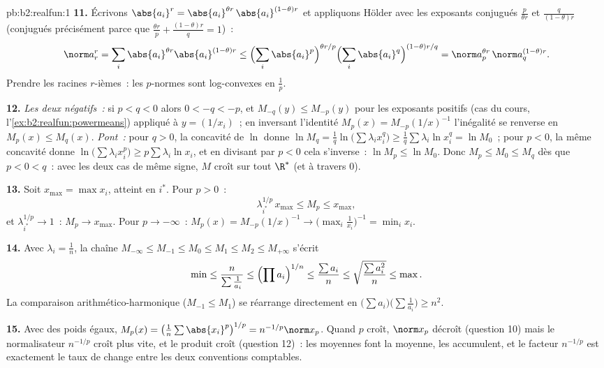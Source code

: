 \begin{solution}{pb:b2:realfun:1}
\textbf{11.} Écrivons $\abs{a_i}^r = \abs{a_i}^{\theta
r}\,\abs{a_i}^{(1-\theta)r}$ et appliquons Hölder avec les exposants
conjugués $\frac{p}{\theta r}$ et
$\frac{q}{(1-\theta)r}$ (conjugués précisément parce que
$\frac{\theta r}p + \frac{(1-\theta)r}q = 1$)~:
\[
\norm a_r^r = \sum_i \abs{a_i}^{\theta r}\abs{a_i}^{(1-\theta)r}
\leq \Bigl(\sum_i\abs{a_i}^{p}\Bigr)^{\theta r/p}
\Bigl(\sum_i\abs{a_i}^{q}\Bigr)^{(1-\theta)r/q}
= \norm a_p^{\theta r}\,\norm a_q^{(1-\theta)r} .
\]
Prendre les racines $r$-ièmes~: les $p$-normes sont log-convexes en
$\frac1p$.

\textbf{12.} \emph{Les deux négatifs~:} si $p < q < 0$ alors $0 < -q
< -p$, et $M_{-q}(y) \leq M_{-p}(y)$ pour les exposants positifs (cas
du cours, l'\cref{ex:b2:realfun:powermeans}) appliqué à $y =
(1/x_i)$~; en inversant l'identité $M_p(x) = M_{-p}(1/x)^{-1}$
l'inégalité se renverse en $M_p(x) \leq M_q(x)$.
\emph{Pont~:} pour $q > 0$, la concavité de $\ln$ donne $\ln M_q =
\frac1q\ln\bigl(\sum\lambda_ix_i^q\bigr) \geq
\frac1q\sum\lambda_i\ln x_i^q = \ln M_0$~; pour $p < 0$, la même
concavité donne $\ln\bigl(\sum\lambda_ix_i^p\bigr) \geq
p\sum\lambda_i\ln x_i$, et en divisant par $p < 0$ cela s'inverse~:
$\ln M_p \leq \ln M_0$. Donc $M_p \leq M_0 \leq M_q$ dès que $p < 0 <
q$~: avec les deux cas de même signe, $M$ croît sur tout
$\R^*$ (et à travers $0$).

\textbf{13.} Soit $x_{\max} = \max x_i$, atteint en $i^*$. Pour
$p > 0$~:
\[
\lambda_{i^*}^{1/p}\,x_{\max} \leq M_p \leq x_{\max},
\]
et $\lambda_{i^*}^{1/p} \to 1$~: $M_p \to x_{\max}$. Pour $p \to
-\infty$~: $M_p(x) = M_{-p}(1/x)^{-1} \to
\bigl(\max_i\frac1{x_i}\bigr)^{-1} = \min_ix_i$.

\textbf{14.} Avec $\lambda_i = \frac1n$, la chaîne $M_{-\infty}
\leq M_{-1} \leq M_0 \leq M_1 \leq M_2 \leq M_{+\infty}$ s'écrit
\[
\min \leq \frac{n}{\sum\frac1{a_i}} \leq \Bigl(\prod
a_i\Bigr)^{1/n} \leq \frac{\sum a_i}{n} \leq
\sqrt{\frac{\sum a_i^2}{n}} \leq \max .
\]
La comparaison arithmético-harmonique ($M_{-1} \leq M_1$) se
réarrange directement en
$\bigl(\sum a_i\bigr)\bigl(\sum\frac1{a_i}\bigr) \geq n^2$.

\textbf{15.} Avec des poids égaux, $M_p(x) =
\bigl(\frac1n\sum\abs{x_i}^p\bigr)^{1/p} = n^{-1/p}\norm x_p$.
Quand $p$ croît, $\norm x_p$ décroît (question 10) mais le
normalisateur $n^{-1/p}$ croît plus vite, et le produit
croît (question 12)~: les moyennes font la moyenne, les 
accumulent, et le facteur $n^{-1/p}$ est exactement le taux de change
entre les deux conventions comptables.


\end{solution}
